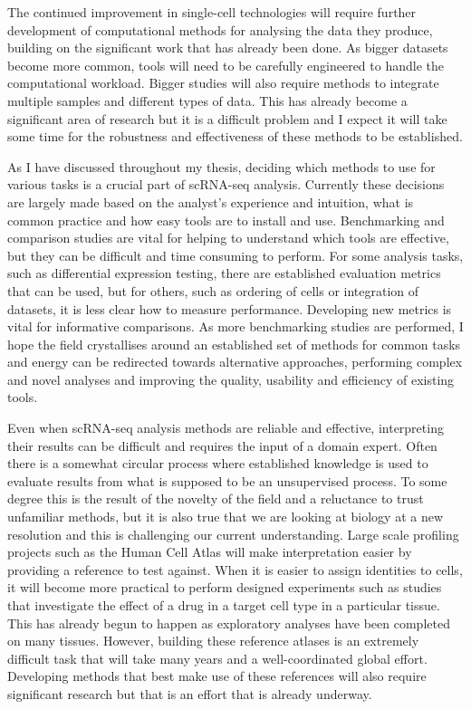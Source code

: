 \documentclass[11pt,a4paper,titlepage,twoside,openright]{style/unimelbthesis}
\theoremstyle{definition}
\theoremstyle{definition}
\theoremstyle{definition}
\theoremstyle{remark}
\begin{document}
\begin{mainmatter}
The continued improvement in single-cell technologies will require further development of computational methods for analysing the data they produce, building on the significant work that has already been done. As bigger datasets become more common, tools will need to be carefully engineered to handle the computational workload. Bigger studies will also require methods to integrate multiple samples and different types of data. This has already become a significant area of research but it is a difficult problem and I expect it will take some time for the robustness and effectiveness of these methods to be established.

As I have discussed throughout my thesis, deciding which methods to use for various tasks is a crucial part of scRNA-seq analysis. Currently these decisions are largely made based on the analyst's experience and intuition, what is common practice and how easy tools are to install and use. Benchmarking and comparison studies are vital for helping to understand which tools are effective, but they can be difficult and time consuming to perform. For some analysis tasks, such as differential expression testing, there are established evaluation metrics that can be used, but for others, such as ordering of cells or integration of datasets, it is less clear how to measure performance. Developing new metrics is vital for informative comparisons. As more benchmarking studies are performed, I hope the field crystallises around an established set of methods for common tasks and energy can be redirected towards alternative approaches, performing complex and novel analyses and improving the quality, usability and efficiency of existing tools.

Even when scRNA-seq analysis methods are reliable and effective, interpreting their results can be difficult and requires the input of a domain expert. Often there is a somewhat circular process where established knowledge is used to evaluate results from what is supposed to be an unsupervised process. To some degree this is the result of the novelty of the field and a reluctance to trust unfamiliar methods, but it is also true that we are looking at biology at a new resolution and this is challenging our current understanding. Large scale profiling projects such as the Human Cell Atlas will make interpretation easier by providing a reference to test against. When it is easier to assign identities to cells, it will become more practical to perform designed experiments such as studies that investigate the effect of a drug in a target cell type in a particular tissue. This has already begun to happen as exploratory analyses have been completed on many tissues. However, building these reference atlases is an extremely difficult task that will take many years and a well-coordinated global effort. Developing methods that best make use of these references will also require significant research but that is an effort that is already underway.


\end{mainmatter}
\end{document}
